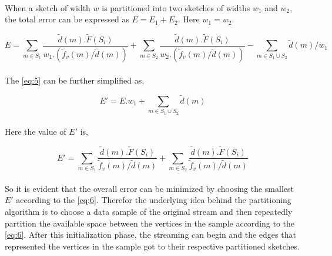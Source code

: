 \paragraph{}
When a sketch of width \(w\) is partitioned into two sketches of widths \(w_1\) and \(w_2\), the total error can be expressed as \(E = E_1 + E_2\). Here \(w_1 = w_2\).

\begin{equation}
    E = \sum_{m \in S_1}^{} \frac{\tilde{d}(m) . \tilde{F}(S_i)}{w_1 . (\tilde{f}_v(m) / \tilde{d}(m))} + \sum_{m \in S_2}^{} \frac{\tilde{d}(m) . \tilde{F}(S_i)}{w_2 . (\tilde{f}_v(m) / \tilde{d}(m))} - \sum_{m \in S_1 \cup S_2}^{} \tilde{d}(m) / w_1
    \label{eq:5}
\end{equation}

\paragraph{}
The \autoref{eq:5} can be further simplified as,

\begin{equation}
    E' = E . w_1 + \sum_{m \in S_1 \cup S_2}^{} \tilde{d}(m)
\end{equation}

\paragraph{}
Here the value of \(E'\) is,

\begin{equation}
    E' = \sum_{m \in S_1}^{} \frac{\tilde{d}(m) . \tilde{F}(S_i)}{\tilde{f}_v(m) / \tilde{d}(m)} + \sum_{m \in S_2}^{} \frac{\tilde{d}(m) . \tilde{F}(S_i)}{\tilde{f}_v(m) / \tilde{d}(m)}
    \label{eq:6}
\end{equation}

\paragraph{}
So it is evident that the overall error can be minimized by choosing the smallest \(E'\) according to the \autoref{eq:6}. Therefor the underlying idea behind the partitioning algorithm is to choose a data sample of the original stream and then repeatedly partition the available space between the vertices in the sample according to the \autoref{eq:6}. After this initialization phase, the streaming can begin and the edges that represented the vertices in the sample got to their respective partitioned sketches.